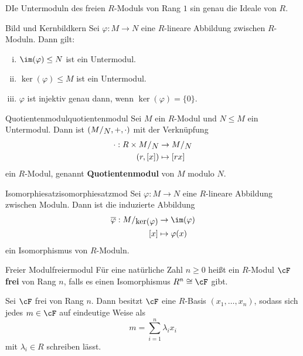 \begin{beispiel}
DIe Untermoduln des freien $R$-Moduls von Rang $1$ sin genau die Ideale von $R$.
\end{beispiel}
\begin{satz}{Bild und Kern}{bildkern}
Sei $\varphi: M \to N$ eine $R$-lineare Abbildung zwischen $R$-Moduln. Dann gilt:
\begin{enumerate}[(i)]
\item $\im (\varphi) \leq N$ ist ein Untermodul.
\item $\ker (\varphi) \leq M$ ist ein Untermodul.
\item $\varphi$ ist injektiv genau dann, wenn $\ker (\varphi) = \{0\}$.
\end{enumerate}
\end{satz}
\begin{definition}{Quotientenmodul}{quotientenmodul}
Sei $M$ ein $R$-Modul und $N \leq M$ ein Untermodul. Dann ist $\left( \quotient{M}{N}, +, \cdot \right)$ mit der Verknüpfung
\begin{equation}
\begin{split}
\cdot: R \times \quotient{M}{N} &\to \quotient{M}{N} \\
(r, [x]) &\mapsto [rx]
\end{split}
\end{equation}
ein $R$-Modul, genannt \textbf{Quotientenmodul} von $M$ modulo $N$.
\end{definition}
\begin{theorem}{Isomorphiesatz}{isomorphiesatzmod}
Sei $\varphi: M \to N$ eine $R$-lineare Abbildung zwischen Moduln. Dann ist die induzierte Abbildung
\begin{equation}
\begin{split}
\overline{\varphi}: \quotient{M}{\ker (\varphi)} &\to \im (\varphi)\\
[x] &\mapsto \varphi(x)
\end{split}
\end{equation}
ein Isomorphismus von $R$-Moduln.
\end{theorem}
\begin{definition}{Freier Modul}{freiermodul}
Für eine natürliche Zahl $n \geq 0$ heißt ein $R$-Modul $\cF$ \textbf{frei} von Rang $n$, falls es einen Isomorphismus $R^n \cong \cF$ gibt.
\end{definition}
\begin{bemerkung}
\item Sei $\cF$ frei von Rang $n$. Dann besitzt $\cF$ eine $R$-Basis $(x_1, \dots, x_n)$, sodass sich jedes $m \in \cF$ auf eindeutige Weise als 
\begin{equation}
m = \sum_{i = 1}^n \lambda_i x_i
\end{equation}
mit $\lambda_i \in R$ schreiben lässt.
\end{bemerkung}
